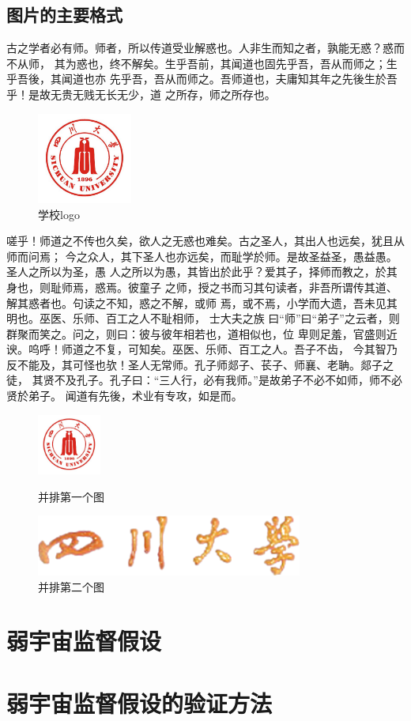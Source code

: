 \subsection{图片的主要格式}
古之学者必有师。师者，所以传道受业解惑也。人非生而知之者，孰能无惑？惑而不从师，
其为惑也，终不解矣。生乎吾前，其闻道也固先乎吾，吾从而师之；生乎吾後，其闻道也亦
先乎吾，吾从而师之。吾师道也，夫庸知其年之先後生於吾乎！是故无贵无贱无长无少，道
之所存，师之所存也。
\begin{figure}[ht]
  \centering%
  \includegraphics[height=3cm]{images/logo}
  \caption{学校logo}
\end{figure}

嗟乎！师道之不传也久矣，欲人之无惑也难矣。古之圣人，其出人也远矣，犹且从师而问焉；
今之众人，其下圣人也亦远矣，而耻学於师。是故圣益圣，愚益愚。圣人之所以为圣，愚
人之所以为愚，其皆出於此乎？爱其子，择师而教之，於其身也，则耻师焉，惑焉。彼童子
之师，授之书而习其句读者，非吾所谓传其道、解其惑者也。句读之不知，惑之不解，或师
焉，或不焉，小学而大遗，吾未见其明也。巫医、乐师、百工之人不耻相师，  士大夫之族
曰“师”曰“弟子”之云者，则群聚而笑之。问之，则曰：彼与彼年相若也，道相似也，位
卑则足羞，官盛则近谀。呜呼！师道之不复，可知矣。巫医、乐师、百工之人。吾子不齿，
今其智乃反不能及，其可怪也欤！圣人无常师。孔子师郯子、苌子、师襄、老聃。郯子之徒，
其贤不及孔子。孔子曰：“三人行，必有我师。”是故弟子不必不如师，师不必贤於弟子。
闻道有先後，术业有专攻，如是而。

\begin{figure}[htb]
	\begin{minipage}{.40\textwidth}
	  \centering
	  \includegraphics[height=2cm]{images/logo}
	  \caption{并排第一个图}
	  \label{fig:parallel1}
	\end{minipage}
	\begin{minipage}{.55\textwidth}
	  \centering
	  \includegraphics[height=2cm]{images/scu}
	  \caption{并排第二个图}
	  \label{fig:parallel2}
	\end{minipage}
\end{figure}
\section{弱宇宙监督假设}
\section{弱宇宙监督假设的验证方法}